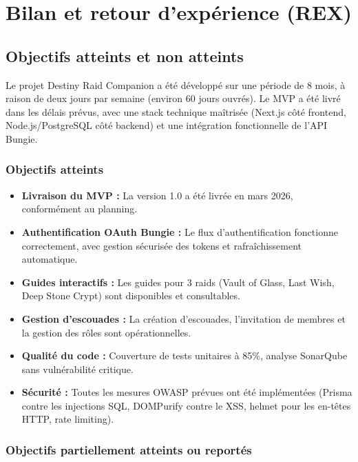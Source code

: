 \chapter{Bilan et retour d'expérience (REX)}

\section{Objectifs atteints et non atteints}

Le projet Destiny Raid Companion a été développé sur une période de 8 mois, à raison de deux jours par semaine (environ 60 jours ouvrés). Le MVP a été livré dans les délais prévus, avec une stack technique maîtrisée (Next.js côté frontend, Node.js/PostgreSQL côté backend) et une intégration fonctionnelle de l'API Bungie.

\subsection*{Objectifs atteints}

\begin{itemize}
    \item \textbf{Livraison du MVP :} La version 1.0 a été livrée en mars 2026, conformément au planning.
    \item \textbf{Authentification OAuth Bungie :} Le flux d'authentification fonctionne correctement, avec gestion sécurisée des tokens et rafraîchissement automatique.
    \item \textbf{Guides interactifs :} Les guides pour 3 raids (Vault of Glass, Last Wish, Deep Stone Crypt) sont disponibles et consultables.
    \item \textbf{Gestion d'escouades :} La création d'escouades, l'invitation de membres et la gestion des rôles sont opérationnelles.
    \item \textbf{Qualité du code :} Couverture de tests unitaires à 85\%, analyse SonarQube sans vulnérabilité critique.
    \item \textbf{Sécurité :} Toutes les mesures OWASP prévues ont été implémentées (Prisma contre les injections SQL, DOMPurify contre le XSS, helmet pour les en-têtes HTTP, rate limiting).
\end{itemize}

\subsection*{Objectifs partiellement atteints ou reportés}

